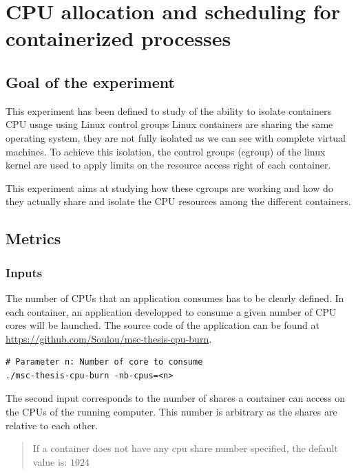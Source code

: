 \chapter{CPU allocation and scheduling for containerized processes}
\label{cpuallocation}

\section{Goal of the experiment}

This experiment has been defined to study of the ability to isolate containers
CPU usage using Linux control groups Linux containers are sharing the same
operating system, they are not fully isolated as we can see with complete
virtual machines. To achieve this isolation, the control groups (cgroup) of the
linux kernel are used to apply limits on the resource access right of each
container.

This experiment aims at studying how these cgroups are working and how do they
actually share and isolate the CPU resources among the different containers.

\section{Metrics}

\subsection{Inputs}

The number of CPUs that an application consumes has to be clearly defined. In
each container, an application developped to consume a given number of CPU
cores will be launched. The source code of the application can be found at
\url{https://github.com/Soulou/msc-thesis-cpu-burn}.

\vspace{1em}

\lstset{language=bash}
\begin{lstlisting}
# Parameter n: Number of core to consume
./msc-thesis-cpu-burn -nb-cpus=<n>
\end{lstlisting}

The second input corresponds to the number of shares a container can access
on the CPUs of the running computer. This number is arbitrary as the shares
are relative to each other. 

\begin{quote}
If a container does not have any cpu share number specified, the default value
is: $1024$
\end{quote}

